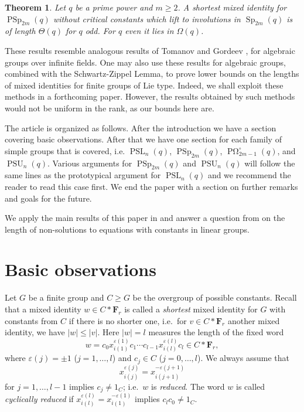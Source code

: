 \documentclass[a4paper,11pt]{amsproc}
\newcommand{\norm}[1]{\lvert#1\rvert}%
\DeclareMathOperator{\Sp}{Sp}%
\DeclareMathOperator{\PSp}{PSp}%
\DeclareMathOperator{\PSU}{PSU}%
\DeclareMathOperator{\POmega}{P\Omega}
\newcommand{\freegrp}{\mathbf F}%
\DeclareMathOperator{\PSL}{PSL}%
\theoremstyle{plain}
\newtheorem{theorem}{Theorem}
\theoremstyle{definition}
\begin{document}
	\begin{theorem} \label{thm:sp}
		Let $q$ be a prime power and $m\geq2$. A shortest mixed identity for $\PSp_{2m}(q)$ without critical constants which lift to involutions in $\Sp_{2m}(q)$ is of length $\Theta(q)$ for $q$ odd. For $q$ even it lies in $\Omega(q)$.
	\end{theorem}
	
	These results resemble analogous results of Tomanov \cite{tomanov1985generalized} and Gordeev \cite{gordeev1997freedom}, for algebraic groups over infinite fields. 
	One may also use these results for algebraic groups, combined with the 
	Schwartz-Zippel Lemma, 
	to prove lower bounds on the lengths of mixed 
	identities for finite groups of Lie type. 
	Indeed, we shall exploit these methods in a 
	forthcoming paper. 
	However, the results obtained by such methods would not be uniform in the rank, as our bounds here are. 
	
	The article is organized as follows. After the introduction we have a section covering basic observations. After that we have one section for each family of simple groups that is covered, i.e. $\PSL_n(q)$, $\PSp_{2m}(q)$, $\POmega_{2m-1}^\circ(q)$, and $\PSU_n(q)$. Various arguments for $\PSp_{2m}(q)$ and $\PSU_n(q)$ will follow the same lines as the prototypical argument for $\PSL_n(q)$ and we recommend the reader to read this case first. We end the paper with a section on further remarks and goals for the future.
	
	We apply the main results of this paper in \cite{bradford2023length} and answer a question from \cite{bradford2021lawless} on the length of non-solutions to equations with constants in linear groups.
	
	\section{Basic observations}
	
	Let $G$ be a finite group and $C\geq G$ be the overgroup of possible constants. Recall that a mixed identity $w\in C\ast\freegrp_r$ is called a \emph{shortest} mixed identity for $G$ with constants from $C$ if there is no shorter one, i.e.\ for $v\in C\ast\freegrp_r$ another mixed identity, we have $\norm{w}\leq\norm{v}$. Here $\norm{w}=l$ measures the length of the fixed word
	$$
	w=c_0 x_{i(1)}^{\varepsilon(1)} c_1 \cdots c_{l-1} x_{i(l)}^{\varepsilon(l)} c_l\in C\ast\freegrp_r,
	$$ 
	where $\varepsilon(j)=\pm1$ ($j=1,\ldots,l$) and $c_j\in C$ ($j=0,\ldots,l$). We always assume that
	$$
	x_{i(j)}^{\varepsilon(j)}=x_{i(j+1)}^{-\varepsilon(j+1)}
	$$ 
	for $j=1,\ldots,l-1$ implies $c_j\neq 1_C$; i.e.\ $w$ is \emph{reduced}. The word $w$ is called \emph{cyclically reduced} if $x_{i(l)}^{\varepsilon(l)}=x_{i(1)}^{-\varepsilon(1)}$ implies $c_lc_0\neq 1_C$.
	
\end{document}
